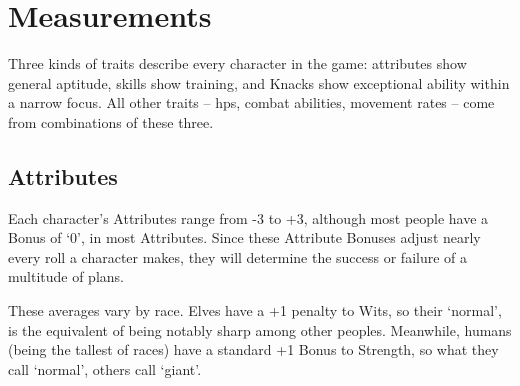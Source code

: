 \chapter{Measurements}

Three kinds of \glspl{trait} describe every character in the game: \glspl{attribute} show general aptitude, \glspl{skill} show training, and Knacks show exceptional ability within a narrow focus.
All other \glspl{trait} -- \glspl{hp}, combat abilities, movement rates -- come from combinations of these three.

\section{Attributes}
\label{randomAttributes}

\begin{multicols}{2}


\noindent
Each character's Attributes range from -3 to +3, although most people have a Bonus of `0', in most Attributes.
Since these Attribute Bonuses adjust nearly every roll a character makes, they will determine the success or failure of a multitude of plans.

These averages vary by race.
Elves have a +1 penalty to Wits, so their `normal', is the equivalent of being notably sharp among other peoples.
Meanwhile, humans (being the tallest of races) have a standard +1 Bonus to Strength, so what they call `normal', others call `giant'.


\end{multicols}
